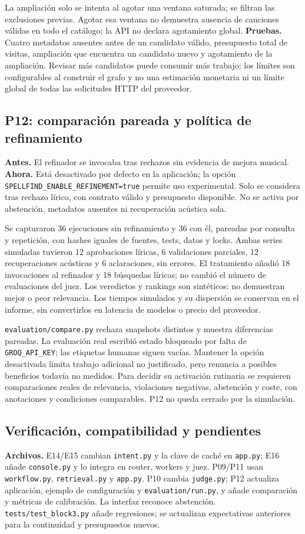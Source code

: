La ampliación solo se intenta al agotar una ventana saturada; se filtran las
exclusiones previas. Agotar esa ventana no demuestra ausencia de canciones
válidas en todo el catálogo; la API no declara agotamiento global.
\textbf{Pruebas.} Cuatro metadatos ausentes antes de un candidato válido,
presupuesto total de visitas, ampliación que encuentra un candidato nuevo y
agotamiento de la ampliación. Revisar más candidatos puede consumir más trabajo;
los límites son configurables al construir el grafo y no una estimación monetaria
ni un límite global de todas las solicitudes HTTP del proveedor.

\subsection{P12: comparación pareada y política de refinamiento}
\textbf{Antes.} El refinador se invocaba tras rechazos sin evidencia de mejora
musical. \textbf{Ahora.} Está desactivado por defecto en la aplicación; la opción
\texttt{SPELLFIND\_ENABLE\_REFINEMENT=true} permite uso experimental. Solo se
considera tras rechazo lírico, con contrato válido y presupuesto disponible.
No se activa por abstención, metadatos ausentes ni recuperación acústica sola.

Se capturaron 36 ejecuciones sin refinamiento y 36 con él, pareadas por consulta
y repetición, con hashes iguales de fuentes, tests, datos y locks. Ambas series
simuladas tuvieron 12 aprobaciones líricas, 6 validaciones parciales,
12 recuperaciones acústicas y 6 aclaraciones, sin errores. El tratamiento añadió
18 invocaciones al refinador y 18 búsquedas líricas; no cambió el número de
evaluaciones del juez. Los veredictos y rankings son sintéticos: no demuestran
mejor o peor relevancia. Los tiempos simulados y su dispersión se conservan en
el informe, sin convertirlos en latencia de modelos o precio del proveedor.

\texttt{evaluation/compare.py} rechaza snapshots distintos y muestra diferencias
pareadas. La evaluación real escribió estado bloqueado por falta de
\texttt{GROQ\_API\_KEY}; las etiquetas humanas siguen vacías. Mantener la opción
desactivada limita trabajo adicional no justificado, pero renuncia a posibles
beneficios todavía no medidos. Para decidir su activación rutinaria se requieren
comparaciones reales de relevancia, violaciones negativas, abstención y coste,
con anotaciones y condiciones comparables. P12 no queda cerrado por la simulación.

\subsection{Verificación, compatibilidad y pendientes}
\textbf{Archivos.} E14/E15 cambian \texttt{intent.py} y la clave de caché en
\texttt{app.py}; E16 añade \texttt{console.py} y lo integra en router, workers
y juez. P09/P11 usan \texttt{workflow.py}, \texttt{retrieval.py} y \texttt{app.py}.
P10 cambia \texttt{judge.py}; P12 actualiza aplicación, ejemplo de configuración
y \texttt{evaluation/run.py}, y añade comparación y métricas de calibración.
La interfaz reconoce abstención. \texttt{tests/test\_block3.py} añade regresiones;
se actualizan expectativas anteriores para la continuidad y presupuestos nuevos.

